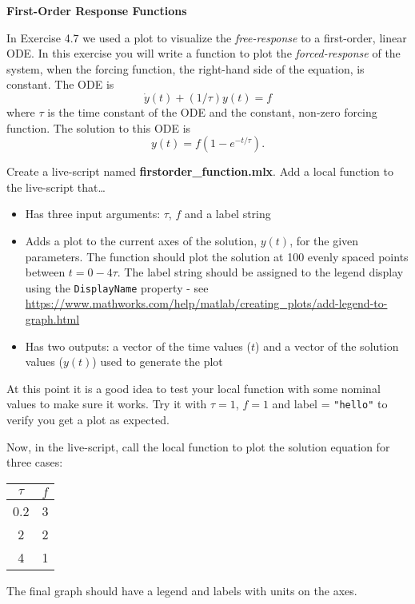 \documentclass[11pt]{article}
\begin{document}
\begin{center}
  \Large{\bf First-Order Response Functions}
\end{center}

In Exercise 4.7 we used a plot to visualize the \emph{free-response} to a first-order, linear ODE.  In this exercise you will write a function to plot the \emph{forced-response} of the system, when the forcing function, the right-hand side of the equation, is constant.  The ODE is 
\[
\dot{y}(t) + (1/\tau) y(t) = f
\]
where $\tau$ is the time constant of the ODE and the constant, non-zero forcing function.  The solution to this ODE is 
\[
y(t) = f(1-e^{-t/\tau}).
\]

Create a live-script named \textbf{firstorder\_function.mlx}.   Add a local function to the live-script that\dots
\begin{itemize}
\item Has three input arguments: $\tau$, $f$ and a label string
\item Adds a plot to the current axes of the solution, $y(t)$, for the given parameters.  The function should plot the solution at 100 evenly spaced points between $t = 0-4\tau$.
The label string should be assigned to the legend display using the \texttt{DisplayName} property - see \url{https://www.mathworks.com/help/matlab/creating_plots/add-legend-to-graph.html}
\item Has two outputs: a vector of the time values ($t$) and a vector of the solution values ($y(t)$) used to generate the plot
\end{itemize}

At this point it is a good idea to test your local function with some nominal values to make sure it works.  Try it with $\tau=1$, $f=1$ and label = \texttt{"hello"} to verify you get a plot as expected.

\vspace{1em}
Now, in the live-script, call the local function to plot the solution equation for three cases: 

\begin{tabular}{|c|c|}
    \hline
    $\tau$ & $f$ \\
    \hline
    0.2   & 3   \\
    \hline
    2   & 2   \\
    \hline
    4   & 1   \\
    \hline
\end{tabular}

The final graph should have a legend and labels with units on the axes.
\end{document}
